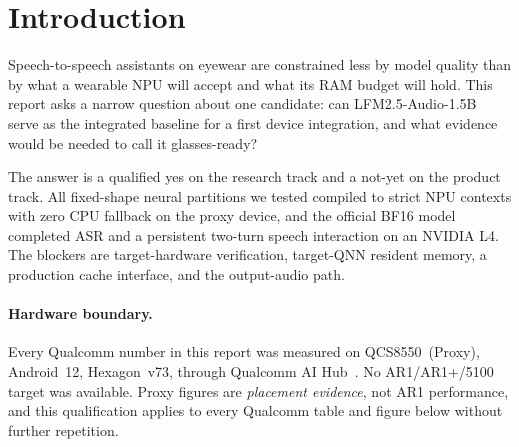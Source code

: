\documentclass[10pt,twocolumn,letterpaper]{article}
\begin{document}
\section{Introduction}

Speech-to-speech assistants on eyewear are constrained less by model quality
than by what a wearable NPU will accept and what its RAM budget will hold.
This report asks a narrow question about one candidate: can
LFM2.5-Audio-1.5B~\citep{lfm25} serve as the integrated baseline for a first
device integration, and what evidence would be needed to call it
glasses-ready?

The answer is a qualified yes on the research track and a not-yet on the
product track. All fixed-shape neural partitions we tested compiled to strict
NPU contexts with zero CPU fallback on the proxy device, and the official BF16
model completed ASR and a persistent two-turn speech interaction on an NVIDIA
L4. The blockers are target-hardware verification, target-QNN resident memory,
a production cache interface, and the output-audio path.

\paragraph{Hardware boundary.}
Every Qualcomm number in this report was measured on QCS8550~(Proxy),
Android~12, Hexagon~v73, through Qualcomm AI Hub~\citep{aihub}. No
AR1/AR1+/5100 target was available. Proxy figures are \emph{placement
evidence}, not AR1 performance, and this qualification applies to every
Qualcomm table and figure below without further repetition.
\end{document}
